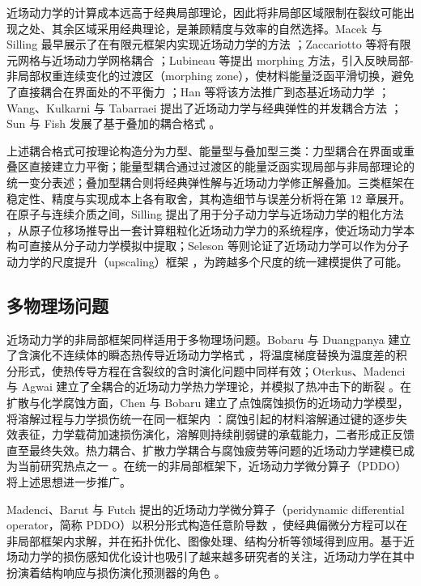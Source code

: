 近场动力学的计算成本远高于经典局部理论，因此将非局部区域限制在裂纹可能出现之处、其余区域采用经典理论，是兼顾精度与效率的自然选择。Macek 与 Silling 最早展示了在有限元框架内实现近场动力学的方法 \cite{Macek2007}；Zaccariotto 等将有限元网格与近场动力学网格耦合 \cite{Zaccariotto2018}；Lubineau 等提出 morphing 方法，引入反映局部-非局部权重连续变化的过渡区（morphing zone），使材料能量泛函平滑切换，避免了直接耦合在界面处的不平衡力 \cite{Lubineau2012}；Han 等将该方法推广到态基近场动力学 \cite{Han2016morphing}；Wang、Kulkarni 与 Tabarraei 提出了近场动力学与经典弹性的并发耦合方法 \cite{Wang2019coupling}；Sun 与 Fish 发展了基于叠加的耦合格式 \cite{SunFish2019}。

上述耦合格式可按理论构造分为力型、能量型与叠加型三类：力型耦合在界面或重叠区直接建立力平衡；能量型耦合通过过渡区的能量泛函实现局部与非局部理论的统一变分表述；叠加型耦合则将经典弹性解与近场动力学修正解叠加。三类框架在稳定性、精度与实现成本上各有取舍，其构造细节与误差分析将在第 12 章展开。在原子与连续介质之间，Silling 提出了用于分子动力学与近场动力学的粗化方法 \cite{Silling2011coarsening}，从原子位移场推导出一套计算粗粒化近场动力学力的系统程序，使近场动力学本构可直接从分子动力学模拟中提取；Seleson 等则论证了近场动力学可以作为分子动力学的尺度提升（upscaling）框架 \cite{Seleson2009}，为跨越多个尺度的统一建模提供了可能。

\subsection{多物理场问题}

近场动力学的非局部框架同样适用于多物理场问题。Bobaru 与 Duangpanya 建立了含演化不连续体的瞬态热传导近场动力学格式 \cite{BobaruDuangpanya2010}，将温度梯度替换为温度差的积分形式，使热传导方程在含裂纹的含时演化问题中同样有效；Oterkus、Madenci 与 Agwai 建立了全耦合的近场动力学热力学理论，并模拟了热冲击下的断裂 \cite{Oterkus2014}。在扩散与化学腐蚀方面，Chen 与 Bobaru 建立了点蚀腐蚀损伤的近场动力学模型，将溶解过程与力学损伤统一在同一框架内 \cite{ChenBobaru2015}：腐蚀引起的材料溶解通过键的逐步失效表征，力学载荷加速损伤演化，溶解则持续削弱键的承载能力，二者形成正反馈直至最终失效。热力耦合、扩散力学耦合与腐蚀疲劳等问题的近场动力学建模已成为当前研究热点之一 \cite{Bobaru2016}。在统一的非局部框架下，近场动力学微分算子（PDDO）将上述思想进一步推广。

Madenci、Barut 与 Futch 提出的近场动力学微分算子（peridynamic differential operator，简称 PDDO）以积分形式构造任意阶导数 \cite{Madenci2016}，使经典偏微分方程可以在非局部框架内求解，并在拓扑优化、图像处理、结构分析等领域得到应用。基于近场动力学的损伤感知优化设计也吸引了越来越多研究者的关注，近场动力学在其中扮演着结构响应与损伤演化预测器的角色 \cite{Madenci2016,MadenciOterkus2014}。

